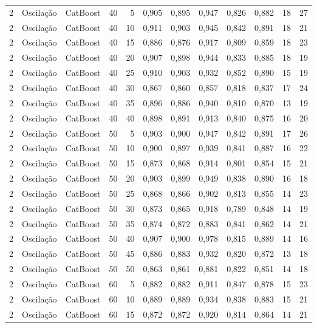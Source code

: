 \begin{longtable}{@{}rllrrrrrrrrr@{}}
2 & Oscilação & CatBoost & 40 & 5 & 0,905 & 0,895 & 0,947 & 0,826 & 0,882 & 18 & 27 \\
2 & Oscilação & CatBoost & 40 & 10 & 0,911 & 0,903 & 0,945 & 0,842 & 0,891 & 18 & 21 \\
2 & Oscilação & CatBoost & 40 & 15 & 0,886 & 0,876 & 0,917 & 0,809 & 0,859 & 18 & 23 \\
2 & Oscilação & CatBoost & 40 & 20 & 0,907 & 0,898 & 0,944 & 0,833 & 0,885 & 18 & 19 \\
2 & Oscilação & CatBoost & 40 & 25 & 0,910 & 0,903 & 0,932 & 0,852 & 0,890 & 15 & 19 \\
2 & Oscilação & CatBoost & 40 & 30 & 0,867 & 0,860 & 0,857 & 0,818 & 0,837 & 17 & 24 \\
2 & Oscilação & CatBoost & 40 & 35 & 0,896 & 0,886 & 0,940 & 0,810 & 0,870 & 13 & 19 \\
2 & Oscilação & CatBoost & 40 & 40 & 0,898 & 0,891 & 0,913 & 0,840 & 0,875 & 16 & 20 \\
2 & Oscilação & CatBoost & 50 & 5 & 0,903 & 0,900 & 0,947 & 0,842 & 0,891 & 17 & 26 \\
2 & Oscilação & CatBoost & 50 & 10 & 0,900 & 0,897 & 0,939 & 0,841 & 0,887 & 16 & 22 \\
2 & Oscilação & CatBoost & 50 & 15 & 0,873 & 0,868 & 0,914 & 0,801 & 0,854 & 15 & 21 \\
2 & Oscilação & CatBoost & 50 & 20 & 0,903 & 0,899 & 0,949 & 0,838 & 0,890 & 16 & 18 \\
2 & Oscilação & CatBoost & 50 & 25 & 0,868 & 0,866 & 0,902 & 0,813 & 0,855 & 14 & 23 \\
2 & Oscilação & CatBoost & 50 & 30 & 0,873 & 0,865 & 0,918 & 0,789 & 0,848 & 14 & 19 \\
2 & Oscilação & CatBoost & 50 & 35 & 0,874 & 0,872 & 0,883 & 0,841 & 0,862 & 14 & 21 \\
2 & Oscilação & CatBoost & 50 & 40 & 0,907 & 0,900 & 0,978 & 0,815 & 0,889 & 14 & 16 \\
2 & Oscilação & CatBoost & 50 & 45 & 0,886 & 0,883 & 0,932 & 0,820 & 0,872 & 13 & 18 \\
2 & Oscilação & CatBoost & 50 & 50 & 0,863 & 0,861 & 0,881 & 0,822 & 0,851 & 14 & 18 \\
2 & Oscilação & CatBoost & 60 & 5 & 0,882 & 0,882 & 0,911 & 0,847 & 0,878 & 15 & 23 \\
2 & Oscilação & CatBoost & 60 & 10 & 0,889 & 0,889 & 0,934 & 0,838 & 0,883 & 15 & 21 \\
2 & Oscilação & CatBoost & 60 & 15 & 0,872 & 0,872 & 0,920 & 0,814 & 0,864 & 14 & 21 \\

\end{longtable}
